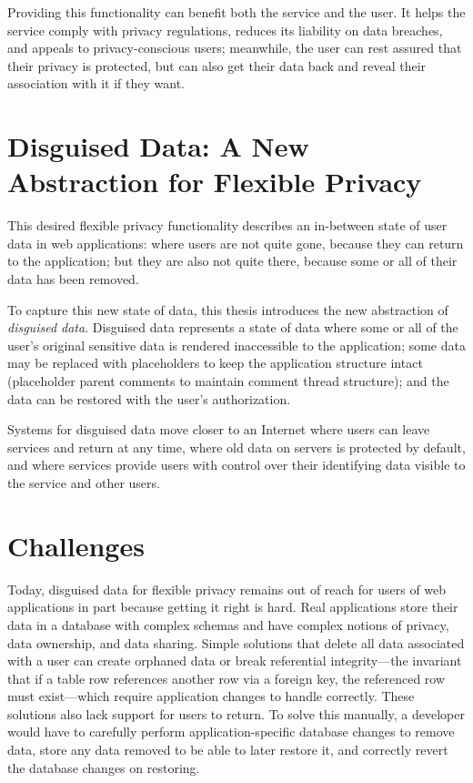 %
Providing this functionality can benefit both the service and the user.
%
It helps the service comply with privacy regulations, reduces its liability on
data breaches, and appeals to privacy-conscious users; meanwhile, the user can
rest assured that their privacy is protected, but can also get their data back
and reveal their association with it if they want.


\section{Disguised Data: A New Abstraction for Flexible Privacy}
%
This desired flexible privacy functionality describes an in-between state of
user data in web applications: where users are not quite gone, because they can
return to the application; but they are also not quite there, because some or
all of their data has been removed.
%

%
To capture this new state of data, this thesis introduces the new 
abstraction of \emph{disguised data}.  Disguised data represents a state of data
where \one{} some or all of the user's original sensitive data is rendered
inaccessible to the application; \two{} some data may be replaced with
placeholders to keep the application structure intact (\eg placeholder parent
comments to maintain comment thread structure); and \three{} the data can be
restored with the user's authorization.
%

%
Systems for disguised data move closer to an Internet where
users can leave services and return at any time, where old data on servers is
protected by default, and where services provide users with control over their
identifying data visible to the service and other users.
%

\section{Challenges} 
Today, disguised data for flexible privacy remains out of reach for users of
web applications in part because getting it right is hard. 
%
Real applications store their data in a database with complex schemas and have
complex notions of privacy, data ownership, and data sharing.
%
Simple solutions that \eg delete all data associated with a user can create
orphaned data or break referential integrity---the invariant that if a table row
references another row via a foreign key, the referenced row must exist---which
require application changes to handle correctly. These solutions also lack
support for users to return.
%
To solve this manually, a developer would have to carefully perform
application-specific database changes to remove data, store any data removed to
be able to later restore it, and correctly revert the database changes on
restoring.
%

